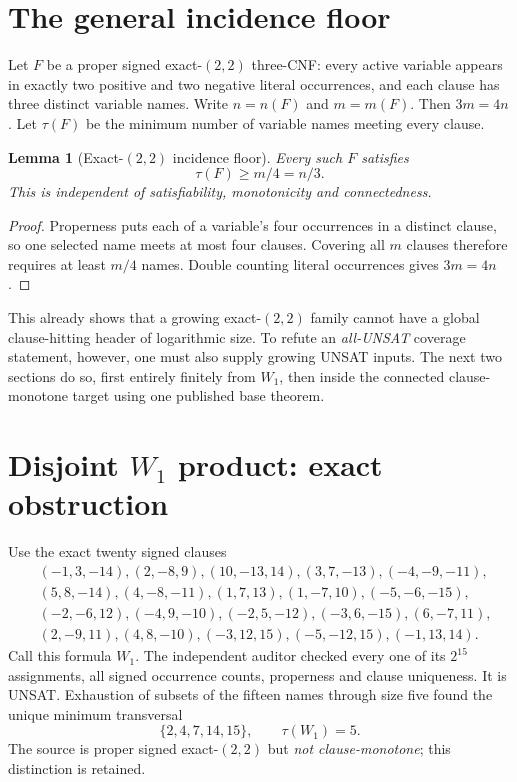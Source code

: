 \documentclass[11pt]{article}
\newtheorem{lemma}[theorem]{Lemma}
\begin{document}
\section{The general incidence floor}
Let $F$ be a proper signed exact-$(2,2)$ three-CNF: every active variable
appears in exactly two positive and two negative literal occurrences, and
each clause has three distinct variable names.  Write $n=n(F)$ and $m=m(F)$.
Then $3m=4n$.  Let $\tau(F)$ be the minimum number of variable names meeting
every clause.

\begin{lemma}[Exact-$(2,2)$ incidence floor]\label{lem:floor}
Every such $F$ satisfies
\[
                  \tau(F)\ge m/4=n/3.                 \tag{1}
\]
This is independent of satisfiability, monotonicity and connectedness.
\end{lemma}
\begin{proof}
Properness puts each of a variable's four occurrences in a distinct clause,
so one selected name meets at most four clauses.  Covering all $m$ clauses
therefore requires at least $m/4$ names.  Double counting literal
occurrences gives $3m=4n$.
\end{proof}

This already shows that a growing exact-$(2,2)$ family cannot have a global
clause-hitting header of logarithmic size.  To refute an \emph{all-UNSAT}
coverage statement, however, one must also supply growing UNSAT inputs.
The next two sections do so, first entirely finitely from $W_1$, then inside
the connected clause-monotone target using one published base theorem.

\section{Disjoint $W_1$ product: exact obstruction}
Use the exact twenty signed clauses
\[
\begin{split}
&(-1,3,-14),(2,-8,9),(10,-13,14),(3,7,-13),(-4,-9,-11),\\
&(5,8,-14),(4,-8,-11),(1,7,13),(1,-7,10),(-5,-6,-15),\\
&(-2,-6,12),(-4,9,-10),(-2,5,-12),(-3,6,-15),(6,-7,11),\\
&(2,-9,11),(4,8,-10),(-3,12,15),(-5,-12,15),(-1,13,14).
\end{split}                                                     \tag{2}
\]
Call this formula $W_1$.  The independent auditor checked every one of its
$2^{15}$ assignments, all signed occurrence counts, properness and clause
uniqueness.  It is UNSAT.  Exhaustion of subsets of the fifteen names through
size five found the unique minimum transversal
\[
                   \{2,4,7,14,15\},\qquad \tau(W_1)=5.          \tag{3}
\]
The source is proper signed exact-$(2,2)$ but \emph{not clause-monotone}; this
distinction is retained.
\end{document}
